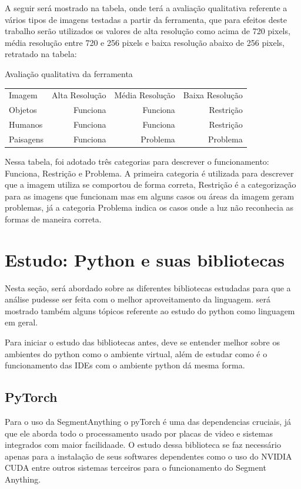A seguir será mostrado na tabela, onde terá a avaliação qualitativa referente a vários tipos de imagens testadas a partir da ferramenta, que para efeitos deste trabalho serão utilizados os valores de alta resolução como acima de 720 pixels, média resolução entre 720 e 256 pixels e baixa resolução abaixo de 256 pixels, retratado na tabela:

Avaliação qualitativa da ferramenta

\begin{tabular}{l r r r}
    Imagem    & Alta Resolução & Média Resolução & Baixa Resolução \\
    Objetos   & Funciona       & Funciona        & Restrição       \\
    Humanos   & Funciona       & Funciona        & Restrição       \\
    Paisagens & Funciona       & Problema        & Problema        \\
\end{tabular}

Nessa tabela, foi adotado três categorias para descrever o funcionamento: Funciona, Restrição e Problema.
A primeira categoria é utilizada para descrever que a imagem utiliza se comportou de forma correta, Restrição é a categorização para as imagens que funcionam mas em alguns casos ou áreas da imagem geram problemas, já a categoria Problema indica os casos onde a luz não reconhecia as formas de maneira correta.

\section{Estudo: Python e suas bibliotecas}
Nesta seção, será abordado sobre as diferentes bibliotecas estudadas para que a análise pudesse ser feita com o melhor aproveitamento da linguagem.
será mostrado também alguns tópicos referente ao estudo do python como linguagem em geral.

Para iniciar o estudo das bibliotecas antes, deve se entender melhor sobre os ambientes do python como o ambiente virtual, além de estudar como é o funcionamento das IDEs com o ambiente python dá mesma forma.


\subsection{PyTorch}

Para o uso da SegmentAnything o pyTorch é uma das dependencias cruciais, já que ele aborda todo o processamento usado por placas de video e sistemas integrados com maior facilidaade. 
O estudo dessa biblioteca se faz necessário apenas para a instalação de seus softwares dependentes como o uso do NVIDIA CUDA entre outros sistemas terceiros para o funcionamento do Segment Anything.


